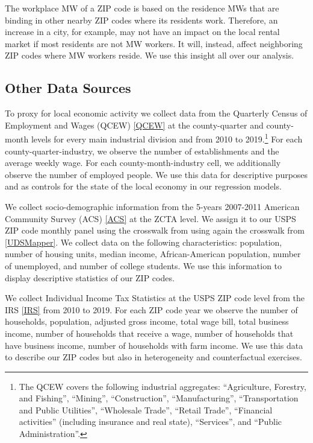 The workplace MW of a ZIP code is based on the residence MWs that are binding in 
other nearby ZIP codes where its residents work. Therefore, an increase in a 
city, for example, may not have an impact on the local rental market if most 
residents are not MW workers. It will, instead, affect neighboring ZIP codes 
where MW workers reside. We use this insight all over our analysis. 


\subsection{Other Data Sources}\label{sec:data/other_data}

To proxy for local economic activity we collect data from the Quarterly Census of 
Employment and Wages (QCEW) \ref{QCEW} at the county-quarter and county-month levels 
for every main industrial division and from 2010 to 2019.\footnote{The QCEW covers the 
	following industrial aggregates: 
	``Agriculture, Forestry, and Fishing'', ``Mining'', ``Construction'', ``Manufacturing'', 
	``Transportation and Public Utilities'', ``Wholesale Trade'', ``Retail Trade'',
	``Financial activities'' (including insurance and real state), ``Services'', and 
	``Public Administration''.}
For each county-quarter-industry, we observe the number of establishments and the 
average weekly wage. For each county-month-industry cell, we additionally observe the number 
of employed people. We use this data for descriptive purposes and as controls for the 
state of the local economy in our regression models. 

We collect socio-demographic information from the 5-years 2007-2011 American Community 
Survey (ACS) \ref{ACS} at the ZCTA level. We assign it to our USPS ZIP code monthly panel using
the crosswalk from using again the crosswalk from \ref{UDSMapper}.
We collect data on the following characteristics: population, number of housing units, 
median income, African-American population, number of unemployed, and number of college 
students. We use this information to display descriptive statistics of our ZIP codes.

We collect Individual Income Tax Statistics at the USPS ZIP code level from the IRS \ref{IRS} 
from 2010 to 2019. For each ZIP code year we observe the number of households, population,
adjusted gross income, total wage bill, total business income, number of households that receive 
a wage, number of households that have business income, number of households with farm income. 
We use this data to describe our ZIP codes but also in heterogeneity and counterfactual exercises.

